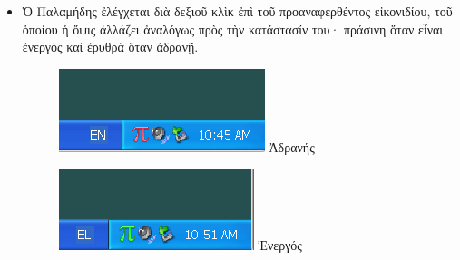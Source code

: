 \documentclass[12pt,a4paper]{article}
\begin{document}
  \begin{itemize}
    \item{}Ὁ Παλαμήδης ἐλέγχεται διὰ δεξιοῦ κλὶκ ἐπὶ τοῦ προαναφερθέντος 
          εἰκονιδίου, τοῦ
          ὁποίου ἡ ὄψις ἀλλάζει ἀναλόγως πρὸς τὴν κατάστασίν του· πράσινη
          ὅταν εἶναι ἐνεργὸς καὶ ἐρυθρὰ ὅταν ἀδρανῇ.

                  \begin{figure}[ht]
                    \begin{center}
                    \begin{minipage}[b]{0.40\linewidth}
                      \centering
                      \includegraphics[width=\textwidth]{p-inactive.png}
                      Ἀδρανής
                    \end{minipage}
                    \hspace{0.5cm}
                    \begin{minipage}[b]{0.40\linewidth}
                      \centering
                      \includegraphics[width=\textwidth]{p-active.png}
                      Ἐνεργός
                    \end{minipage}
                    \end{center}
                  \end{figure}


\end{itemize}
\end{document}
